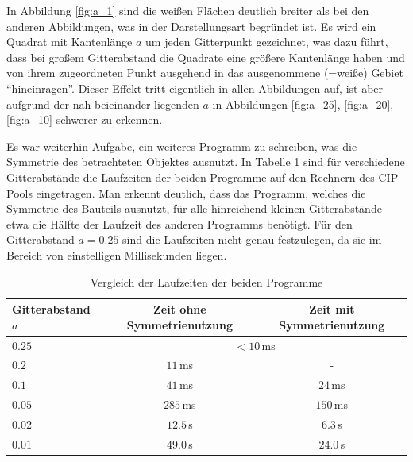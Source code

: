 \documentclass[10pt,a4paper]{article}
\begin{document}
In Abbildung \ref{fig:a_1} sind die weißen Flächen deutlich breiter als bei den anderen Abbildungen, was in der Darstellungsart begründet ist. Es wird ein Quadrat mit Kantenlänge $a$ um jeden Gitterpunkt gezeichnet, was dazu führt, dass bei großem Gitterabstand die Quadrate eine größere Kantenlänge haben und von ihrem zugeordneten Punkt ausgehend in das ausgenommene (=weiße) Gebiet "`hineinragen"'. Dieser Effekt tritt eigentlich in allen Abbildungen auf, ist aber aufgrund der nah beieinander liegenden $a$ in Abbildungen \ref{fig:a_25}, \ref{fig:a_20}, \ref{fig:a_10} schwerer zu erkennen.
\par
Es war weiterhin Aufgabe, ein weiteres Programm zu schreiben, was die Symmetrie des betrachteten Objektes ausnutzt. In Tabelle \ref{tab:zeiten} sind für verschiedene Gitterabstände die Laufzeiten der beiden Programme auf den Rechnern des CIP-Pools eingetragen. Man erkennt deutlich, dass das Programm, welches die Symmetrie des Bauteils ausnutzt, für alle hinreichend kleinen Gitterabstände etwa die Hälfte der Laufzeit des anderen Programms benötigt. Für den Gitterabstand $a=\num{0,25}$ sind die Laufzeiten nicht genau festzulegen, da sie im Bereich von einstelligen Millisekunden liegen.
\begin{table}
\centering
\begin{tabular}{l c c}
\toprule
Gitterabstand $a$ & Zeit ohne Symmetrienutzung & Zeit mit Symmetrienutzung \\\midrule
$\num{0,25}$ & \multicolumn{2}{c}{$<\num{10}$\,\si{\milli\second}}\\
$\num{0,2}$  & $\num{11}$\,\si{\milli\second}    & -\footnotemark \\
$\num{0,1}$  & $\num{41}$\,\si{\milli\second}    & $\num{24}$\,\si{\milli\second} \\
$\num{0,05}$ & $\num{285}$\,\si{\milli\second}   & $\num{150}$\,\si{\milli\second} \\
$\num{0,02}$ & $\num{12,5}$\,\si{\second}        & $\num{6,3}$\,\si{\second} \\
$\num{0,01}$ & $\num{49,0}$\,\si{\second}        & $\num{24,0}$\,\si{\second} \\
\bottomrule
\end{tabular}
\caption{Vergleich der Laufzeiten der beiden Programme}
\label{tab:zeiten}
\end{table}
\end{document}
